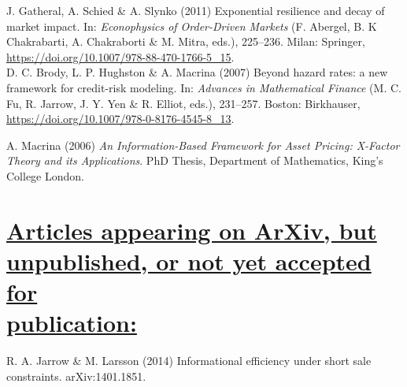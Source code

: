 \documentclass{ws-ijtaf}
\begin{document}

\noindent J. Gatheral, A. Schied \& A. Slynko (2011) Exponential resilience and decay of market impact. In: {\it Econophysics of Order-Driven Markets} (F. Abergel, B. K Chakrabarti, A. Chakraborti \& M. Mitra, eds.), 225--236. Milan: Springer, \url{https://doi.org/10.1007/978-88-470-1766-5_15}.\\[2pt]

\noindent D. C. Brody, L. P. Hughston \& A. Macrina (2007) Beyond hazard rates: a new framework for credit-risk modeling. In: {\it Advances in Mathematical Finance} (M. C. Fu, R. Jarrow, J. Y. Yen \& R. Elliot, eds.), 231--257. Boston: Birkhauser, \url{https://doi.org/10.1007/978-0-8176-4545-8_13}.


\noindent A. Macrina (2006) {\it An Information-Based Framework for Asset Pricing: X-Factor Theory and its Applications}. PhD Thesis, Department of Mathematics, King's College London.

\section*{\underline{Articles appearing on ArXiv, but unpublished, or not yet accepted for}\\ \underline{publication:}}

R. A. Jarrow \& M. Larsson (2014) Informational efficiency under short sale constraints. arXiv:1401.1851.

\end{document}
